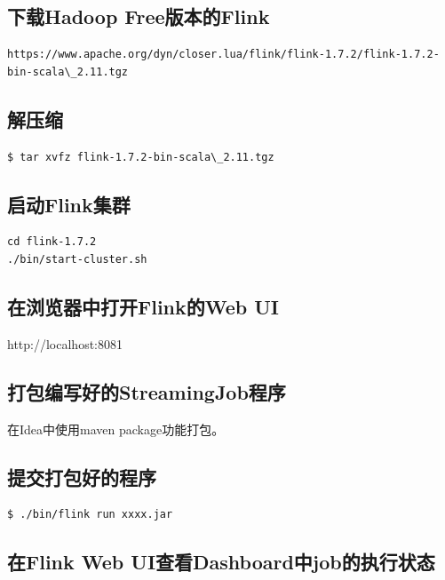 \documentclass[oneside]{ctexbook}
\begin{document}
\subsection{下载Hadoop Free版本的Flink}

\begin{lstlisting}[breaklines]
https://www.apache.org/dyn/closer.lua/flink/flink-1.7.2/flink-1.7.2-bin-scala\_2.11.tgz
\end{lstlisting}

\subsection{解压缩}

\begin{lstlisting}
$ tar xvfz flink-1.7.2-bin-scala\_2.11.tgz
\end{lstlisting}

\subsection{启动Flink集群}

\begin{lstlisting}
cd flink-1.7.2
./bin/start-cluster.sh
\end{lstlisting}

\subsection{在浏览器中打开Flink的Web UI}

http://localhost:8081

\subsection{打包编写好的StreamingJob程序}

在Idea中使用maven package功能打包。

\subsection{提交打包好的程序}

\begin{lstlisting}
$ ./bin/flink run xxxx.jar
\end{lstlisting}

\subsection{在Flink Web UI查看Dashboard中job的执行状态}
\end{document}
